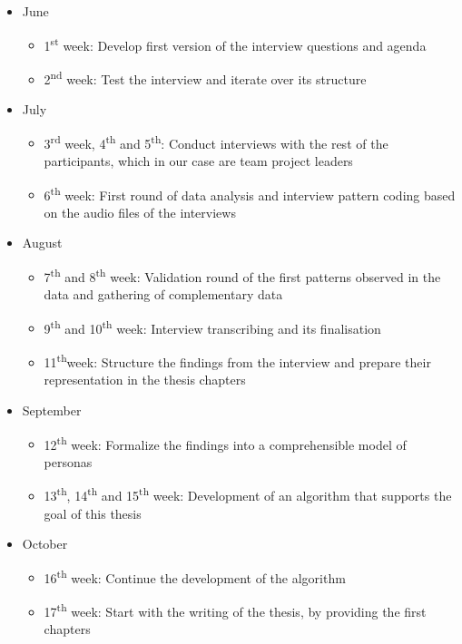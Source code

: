 \documentclass[a4paper]{article}
\begin{document}
\begin{itemize}
\item June
	\begin{itemize}
	\item 1\textsuperscript{st} week: Develop first version of the interview questions and agenda
	\item 2\textsuperscript{nd} week: Test the interview and iterate over its structure
	\end{itemize}
\item July
	\begin{itemize}
	\item 3\textsuperscript{rd} week, 4\textsuperscript{th} and 5\textsuperscript{th}: Conduct interviews with the rest of the participants, which in our case are team project leaders 
	\item 6\textsuperscript{th} week: First round of data analysis and interview pattern coding based on the audio files of the interviews
	\end{itemize}
\item August
	\begin{itemize}
	\item 7\textsuperscript{th} and 8\textsuperscript{th} week:  Validation round of the first patterns observed in the data and gathering of complementary data
	\item 9\textsuperscript{th} and 10\textsuperscript{th} week: Interview transcribing and its finalisation
	\item 11\textsuperscript{th}week: Structure the findings from the interview and prepare their representation in the thesis
	 chapters
	\end{itemize}	
\item September
	\begin{itemize}
	\item 12\textsuperscript{th} week: Formalize the findings into a comprehensible model of personas
	\item 13\textsuperscript{th}, 14\textsuperscript{th} and 15\textsuperscript{th} week:  Development of an algorithm that supports the goal of this thesis
	\end{itemize}	
\item October
	\begin{itemize}
	\item 16\textsuperscript{th} week:  Continue the development of the algorithm
	\item 17\textsuperscript{th} week: Start with the writing of the thesis, by providing the first chapters

\end{itemize}
\end{itemize}
\end{document}

